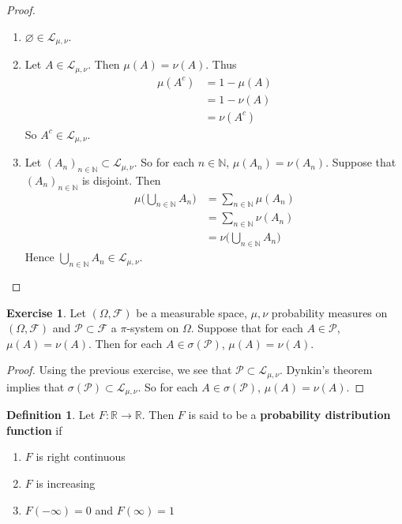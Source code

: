 \documentclass[12pt]{amsart}
\theoremstyle{definition}
\newtheorem{defn}[definition]{Definition}
\newtheorem{ex}[definition]{Exercise}
\newcommand{\sig}{\sigma}
\newcommand{\Om}{\Omega}
\newcommand{\N}{\mathbb{N}}
\newcommand{\R}{\mathbb{R}}
\newcommand{\MF}{\mathcal{F}}
\newcommand{\ML}{\mathcal{L}}
\newcommand{\MP}{\mathcal{P}}
\begin{document}
	\begin{proof}\
		\begin{enumerate}
			\item $\varnothing \in \ML_{\mu, \nu}$.
			\item Let $A \in \ML_{\mu, \nu}$. Then $\mu(A) = \nu(A)$. Thus 
			\begin{align*}
				\mu(A^c) 
				&= 1-\mu(A) \\
				&= 1 -\nu(A) \\
				&= \nu(A^c)
			\end{align*}
			So $A^c \in \ML_{\mu, \nu}$. 
			\item Let $(A_n)_{n \in \N} \subset \ML_{\mu, \nu}$. So for each $n \in \N$, $\mu(A_n) = \nu(A_n)$.  Suppose that $(A_n)_{n \in \N}$ is disjoint. Then 
			\begin{align*}
				\mu\bigg(\bigcup_{n \in \N} A_n\bigg) 
				&= \sum_{n \in \N} \mu(A_n) \\
				&= \sum_{n \in \N} \nu(A_n) \\
				&= \nu\bigg(\bigcup_{n \in \N} A_n\bigg) 
			\end{align*}
			Hence $\bigcup_{n \in \N} A_n \in \ML_{\mu, \nu}$.
		\end{enumerate}
	\end{proof}
	
	\begin{ex}
		Let $(\Om, \MF)$ be a measurable space, $\mu, \nu$ probability measures on $(\Om, \MF)$ and $\MP \subset \MF$ a $\pi$-system on $\Om$. Suppose that for each $A \in \MP$, $\mu(A) = \nu(A)$. Then for each $A \in \sig(\MP)$, $\mu(A) = \nu(A)$.
	\end{ex}
	
	\begin{proof}
		Using the previous exercise, we see that $\MP \subset \ML_{\mu, \nu}$. Dynkin's theorem implies that $\sig(\MP) \subset \ML_{\mu, \nu}$. So for each $A \in \sig(\MP)$, $\mu(A) = \nu(A)$.
	\end{proof}
	
	
	
	
	
	
	
	
	\begin{defn}
		Let $F: \R \rightarrow \R$. Then $F$ is said to be a \textbf{probability distribution function} if 
		\begin{enumerate}
			\item $F$ is right continuous
			\item $F$ is increasing
			\item $F(-\infty)  = 0$ and $F(\infty)  = 1$
		\end{enumerate}
	\end{defn}
	
\end{document}
